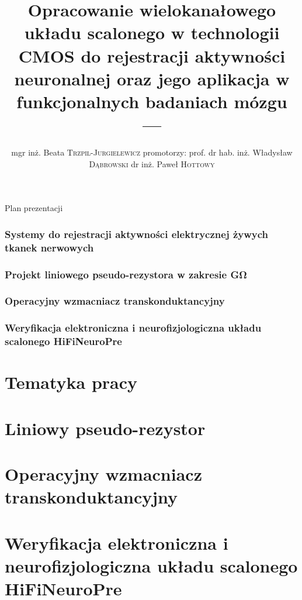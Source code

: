 \documentclass[aspectratio=1610, polish]{beamer}
\author[Beata Trzpil-Jurgielewicz]{mgr inż. Beata \textsc{Trzpil-Jurgielewicz}
\newline 
promotorzy:
\newline
prof. dr hab. inż. Władysław \textsc{Dąbrowski} 
\newline 
dr inż. Paweł \textsc{Hottowy}}
\date{}
\title[]{Opracowanie wielokanałowego układu scalonego w technologii CMOS do rejestracji aktywności neuronalnej oraz jego aplikacja w funkcjonalnych badaniach mózgu
	}
\title{---}
\begin{document}
\maketitle


\begin{frame}{Plan prezentacji}
	\tableofcontents%
\end{frame}
\section{Systemy do rejestracji aktywności elektrycznej żywych tkanek nerwowych}
\section{Projekt liniowego pseudo-rezystora w zakresie \si{\giga\ohm}}
\section{Operacyjny wzmacniacz transkonduktancyjny}
\section{Weryfikacja elektroniczna i neurofizjologiczna układu scalonego HiFiNeuroPre}

\part{Tematyka pracy}


\part{Liniowy pseudo-rezystor}



\part{Operacyjny wzmacniacz transkonduktancyjny}



\part{Weryfikacja elektroniczna i neurofizjologiczna układu scalonego HiFiNeuroPre}

\end{document}
